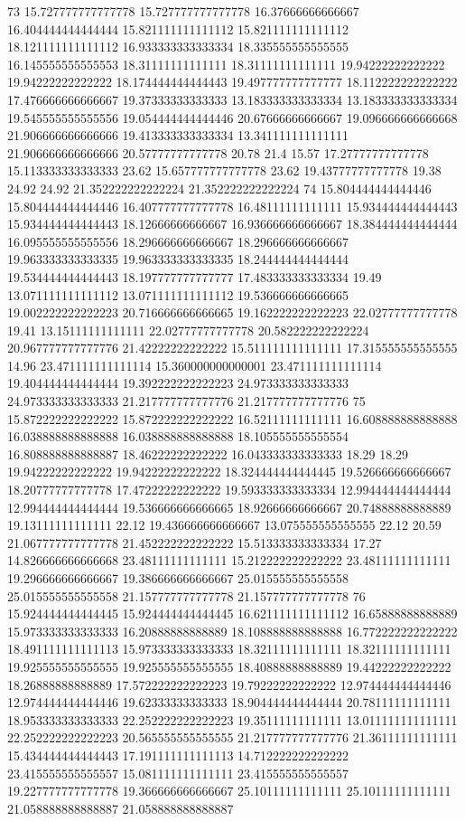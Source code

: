 73 15.727777777777778 15.727777777777778 16.37666666666667 16.404444444444444 15.821111111111112 15.821111111111112 18.121111111111112 16.933333333333334 18.335555555555555 16.145555555555553 18.31111111111111 18.31111111111111 19.94222222222222 19.94222222222222 18.174444444444443 19.497777777777777 18.112222222222222 17.476666666666667 19.37333333333333 13.183333333333334 13.183333333333334 19.545555555555556 19.054444444444446 20.67666666666667 19.096666666666668 21.906666666666666 19.413333333333334 13.341111111111111 21.906666666666666 20.57777777777778 20.78 21.4 15.57 17.27777777777778 15.113333333333333 23.62 15.657777777777778 23.62 19.43777777777778 19.38 24.92 24.92 21.352222222222224 21.352222222222224
74 15.804444444444446 15.804444444444446 16.407777777777778 16.48111111111111 15.934444444444443 15.934444444444443 18.12666666666667 16.936666666666667 18.384444444444444 16.095555555555556 18.296666666666667 18.296666666666667 19.963333333333335 19.963333333333335 18.244444444444444 19.534444444444443 18.197777777777777 17.483333333333334 19.49 13.071111111111112 13.071111111111112 19.536666666666665 19.002222222222223 20.716666666666665 19.162222222222223 22.02777777777778 19.41 13.15111111111111 22.02777777777778 20.582222222222224 20.967777777777776 21.42222222222222 15.511111111111111 17.315555555555555 14.96 23.471111111111114 15.360000000000001 23.471111111111114 19.404444444444444 19.392222222222223 24.973333333333333 24.973333333333333 21.217777777777776 21.217777777777776
75 15.872222222222222 15.872222222222222 16.52111111111111 16.608888888888888 16.038888888888888 16.038888888888888 18.105555555555554 16.808888888888887 18.46222222222222 16.043333333333333 18.29 18.29 19.94222222222222 19.94222222222222 18.324444444444445 19.526666666666667 18.20777777777778 17.47222222222222 19.593333333333334 12.994444444444444 12.994444444444444 19.536666666666665 18.92666666666667 20.74888888888889 19.13111111111111 22.12 19.436666666666667 13.075555555555555 22.12 20.59 21.067777777777778 21.452222222222222 15.513333333333334 17.27 14.826666666666668 23.48111111111111 15.212222222222222 23.48111111111111 19.296666666666667 19.386666666666667 25.015555555555558 25.015555555555558 21.157777777777778 21.157777777777778
76 15.924444444444445 15.924444444444445 16.621111111111112 16.65888888888889 15.973333333333333 16.20888888888889 18.108888888888888 16.772222222222222 18.491111111111113 15.973333333333333 18.32111111111111 18.32111111111111 19.925555555555555 19.925555555555555 18.40888888888889 19.44222222222222 18.26888888888889 17.572222222222223 19.79222222222222 12.974444444444446 12.974444444444446 19.62333333333333 18.904444444444444 20.78111111111111 18.953333333333333 22.252222222222223 19.35111111111111 13.011111111111111 22.252222222222223 20.565555555555555 21.217777777777776 21.36111111111111 15.434444444444443 17.191111111111113 14.712222222222222 23.415555555555557 15.081111111111111 23.415555555555557 19.227777777777778 19.366666666666667 25.10111111111111 25.10111111111111 21.058888888888887 21.058888888888887
